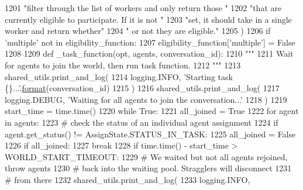 \begin{DoxyCode}
1201                     \textcolor{stringliteral}{"filter through the list of workers and only return those "}
1202                     \textcolor{stringliteral}{"that are currently eligible to participate. If it is not "}
1203                     \textcolor{stringliteral}{"set, it should take in a single worker and return whether"}
1204                     \textcolor{stringliteral}{" or not they are eligible."}
1205                 )
1206             \textcolor{keywordflow}{if} \textcolor{stringliteral}{'multiple'} \textcolor{keywordflow}{not} \textcolor{keywordflow}{in} eligibility\_function:
1207                 eligibility\_function[\textcolor{stringliteral}{'multiple'}] = \textcolor{keyword}{False}
1208 
1209         \textcolor{keyword}{def }\_task\_function(opt, agents, conversation\_id):
1210             \textcolor{stringliteral}{"""}
1211 \textcolor{stringliteral}{            Wait for agents to join the world, then run task function.}
1212 \textcolor{stringliteral}{            """}
1213             shared\_utils.print\_and\_log(
1214                 logging.INFO, \textcolor{stringliteral}{'Starting task \{\}...'}.\hyperlink{namespaceparlai_1_1chat__service_1_1services_1_1messenger_1_1shared__utils_a32e2e2022b824fbaf80c747160b52a76}{format}(conversation\_id)
1215             )
1216             shared\_utils.print\_and\_log(
1217                 logging.DEBUG, \textcolor{stringliteral}{'Waiting for all agents to join the conversation...'}
1218             )
1219             start\_time = time.time()
1220             \textcolor{keywordflow}{while} \textcolor{keyword}{True}:
1221                 all\_joined = \textcolor{keyword}{True}
1222                 \textcolor{keywordflow}{for} agent \textcolor{keywordflow}{in} agents:
1223                     \textcolor{comment}{# check the status of an individual agent assignment}
1224                     \textcolor{keywordflow}{if} agent.get\_status() != AssignState.STATUS\_IN\_TASK:
1225                         all\_joined = \textcolor{keyword}{False}
1226                 \textcolor{keywordflow}{if} all\_joined:
1227                     \textcolor{keywordflow}{break}
1228                 \textcolor{keywordflow}{if} time.time() - start\_time > WORLD\_START\_TIMEOUT:
1229                     \textcolor{comment}{# We waited but not all agents rejoined, throw agents}
1230                     \textcolor{comment}{# back into the waiting pool. Stragglers will disconnect}
1231                     \textcolor{comment}{# from there}
1232                     shared\_utils.print\_and\_log(
1233                         logging.INFO,

\end{DoxyCode}
